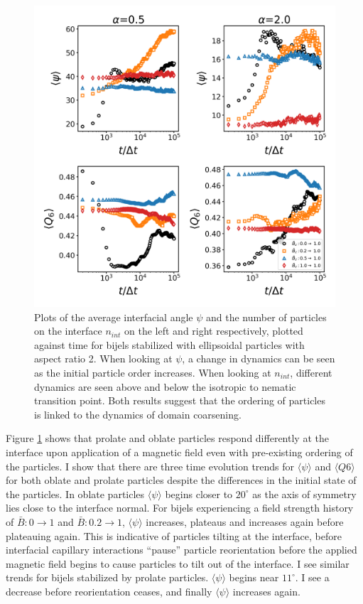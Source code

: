 \begin{figure} 
\centering 
\includegraphics[scale=0.4]{../figures/results/paper2/interface_angle-nint-field_up.png} 
\caption{Plots of the average interfacial angle $\psi$ and the number of particles on the interface $n_{int}$ on the left and right respectively, 
         plotted against time for bijels stabilized with ellipsoidal particles with aspect ratio 2. When looking at $\psi$, a change in dynamics can be 
         seen as the initial particle order increases. When looking at $n_{int}$, different dynamics are seen above and below the isotropic to nematic transition point. 
         Both results suggest that the ordering of particles is linked to the dynamics of domain coarsening.} 
\label{fig:interface_angle-nint-field_up} 
\end{figure}

Figure \ref{fig:interface_angle-nint-field_up} shows that
prolate and oblate particles respond differently at the interface upon application of a magnetic field
even with pre-existing ordering of the particles. I
show that there are three time evolution trends for
$\langle \psi \rangle$ and $\langle Q6 \rangle$ for both oblate and
prolate particles despite the differences in the initial state of the
particles. In oblate particles $\langle \psi \rangle$ begins closer to
$20 ^{\circ}$ as the axis of symmetry lies close to the interface
normal. For bijels experiencing a field strength history of
$\bar{B}: 0 \rightarrow 1$ and $\bar{B}: 0.2 \rightarrow 1$,
$\langle \psi \rangle$ increases, plateaus and increases again before
plateauing again. This is indicative of particles tilting at the
interface, before interfacial capillary interactions ``pause'' particle
reorientation before the applied magnetic field begins to cause
particles to tilt out of the interface. I see similar trends for bijels
stabilized by prolate particles. $\langle \psi \rangle$ begins near
$11 ^{\circ}$. I see a decrease before reorientation ceases, and
finally $\langle \psi \rangle$ increases again.

